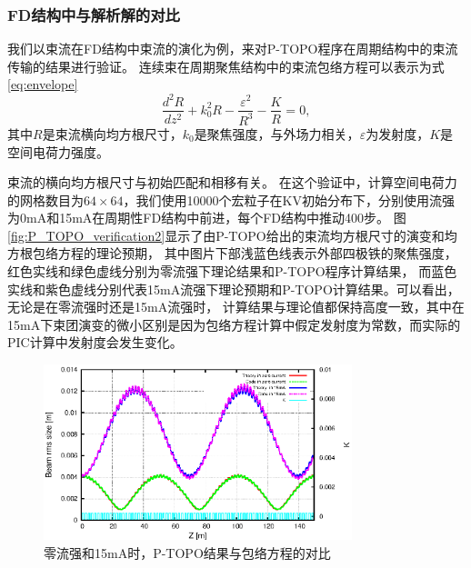 \subsubsection{FD结构中与解析解的对比}
我们以束流在FD结构中束流的演化为例，来对P-TOPO程序在周期结构中的束流传输的结果进行验证。
连续束在周期聚焦结构中的束流包络方程可以表示为式\eqref{eq:envelope}\cite{wangler1998particle,chen1994nonlinear}
\begin{equation}\label{eq:envelope}
  \frac{{{d}^{2}}R}{d{{z}^{2}}}+k_{0}^{2}R-\frac{{{\varepsilon }^{2}}}{{{R}^{3}}}-\frac{K}{R}=0,
\end{equation}
其中$R$是束流横向均方根尺寸，$k_0$是聚焦强度，与外场力相关，$\varepsilon$为发射度，$K$是空间电荷力强度。

束流的横向均方根尺寸与初始匹配和相移有关。
在这个验证中，计算空间电荷力的网格数目为$64 \times 64$，我们使用10000个宏粒子在KV初始分布下，分别使用流强为0mA和15mA在周期性FD结构中前进，每个FD结构中推动400步。
图\eqref{fig:P_TOPO_verification2}显示了由P-TOPO给出的束流均方根尺寸的演变和均方根包络方程的理论预期，
其中图片下部浅蓝色线表示外部四极铁的聚焦强度，红色实线和绿色虚线分别为零流强下理论结果和P-TOPO程序计算结果，
而蓝色实线和紫色虚线分别代表15mA流强下理论预期和P-TOPO计算结果。可以看出，无论是在零流强时还是15mA流强时，
计算结果与理论值都保持高度一致，其中在15mA下束团演变的微小区别是因为包络方程计算中假定发射度为常数，而实际的PIC计算中发射度会发生变化。

\begin{figure}[!htb]
    \centering
    \includegraphics[width=0.8\textwidth]{Img/P_TOPO_verification2.eps}
    \caption{零流强和15mA时，P-TOPO结果与包络方程的对比}
    \label{fig:P_TOPO_verification2}
\end{figure}



